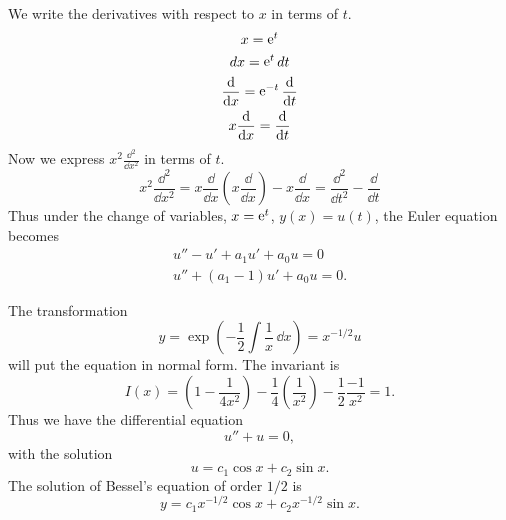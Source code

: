 {%
\begin{Solution}
  \label{solution x2yaxyay=0}
  We write the derivatives with respect to $x$ in terms of $t$.
  \begin{gather*}
    x = \mathop{\mathrm{e}}\nolimits^t \\
    d x = \mathop{\mathrm{e}}\nolimits^t d t \\
    \frac{\mathrm{d}}{\mathrm{d} x} = \mathop{\mathrm{e}}\nolimits^{-t} \frac{\mathrm{d}}{\mathrm{d} t} \\
    x \frac{\mathrm{d}}{\mathrm{d} x} = \frac{\mathrm{d}}{\mathrm{d} t}
  \end{gather*}
  Now we express $x^2 \frac{\dd^2}{\dd x^2}$ in terms of $t$.
  \[
  x^2 \frac{\dd^2}{\dd x^2} 
  = x \frac{\dd}{\dd x}\left(x \frac{\dd}{\dd x}\right) - x \frac{\dd}{\dd x} 
  = \frac{\dd^2}{\dd t^2} - \frac{\dd}{\dd t}
  \]
  Thus under the change of variables, $x = \mathop{\mathrm{e}}\nolimits^t$, $y(x) = u(t)$,
  the Euler equation becomes
  \begin{gather*}
    u'' - u' + a_1 u' + a_0 u = 0 \\
    \boxed{u'' + (a_1-1)u' + a_0 u = 0.}
  \end{gather*}
\end{Solution}








\begin{Solution}
  \label{solution y1xy114x2y=0}
  The transformation
  \[
  y = \exp\left(-\frac{1}{2} \int \frac{1}{x} \,\dd x \right)
  = x^{-1/2} u
  \]
  will put the equation in normal form.  The invariant is
  \[
  I(x) = \left( 1 - \frac{1}{4x^2} \right) - \frac{1}{4} \left( \frac{1}{x^2}
  \right) - \frac{1}{2} \frac{-1}{x^2} = 1.
  \]
  Thus we have the differential equation
  \[
  u'' + u = 0,
  \]
  with the solution
  \[
  u = c_1 \cos x + c_2 \sin x.
  \]
  The solution of Bessel's equation of order $1/2$ is
  \[
  \boxed{
    y = c_1 x^{-1/2} \cos x + c_2 x^{-1/2} \sin x.
    }
  \]
\end{Solution}



\raggedbottom
}
